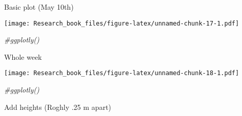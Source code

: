 \documentclass[]{book}
\newenvironment{Shaded}{\begin{snugshade}}{\end{snugshade}}
\newcommand{\KeywordTok}[1]{\textcolor[rgb]{0.13,0.29,0.53}{\textbf{#1}}}
\newcommand{\DataTypeTok}[1]{\textcolor[rgb]{0.13,0.29,0.53}{#1}}
\newcommand{\DecValTok}[1]{\textcolor[rgb]{0.00,0.00,0.81}{#1}}
\newcommand{\StringTok}[1]{\textcolor[rgb]{0.31,0.60,0.02}{#1}}
\newcommand{\CommentTok}[1]{\textcolor[rgb]{0.56,0.35,0.01}{\textit{#1}}}
\newcommand{\OperatorTok}[1]{\textcolor[rgb]{0.81,0.36,0.00}{\textbf{#1}}}
\newcommand{\NormalTok}[1]{#1}
\theoremstyle{definition}
\theoremstyle{definition}
\theoremstyle{definition}
\theoremstyle{remark}
\begin{document}
Basic plot (May 10th)

\begin{Shaded}
\end{Shaded}

\texttt{[image: Research\_book\_files/figure-latex/unnamed-chunk-17-1.pdf]}

\begin{Shaded}
\begin{Highlighting}[]
\CommentTok{#ggplotly()}
\end{Highlighting}
\end{Shaded}

Whole week

\begin{Shaded}
\end{Shaded}

\texttt{[image: Research\_book\_files/figure-latex/unnamed-chunk-18-1.pdf]}

\begin{Shaded}
\begin{Highlighting}[]
\CommentTok{#ggplotly()}
\end{Highlighting}
\end{Shaded}

Add heights (Roghly .25 m apart)
\end{document}
